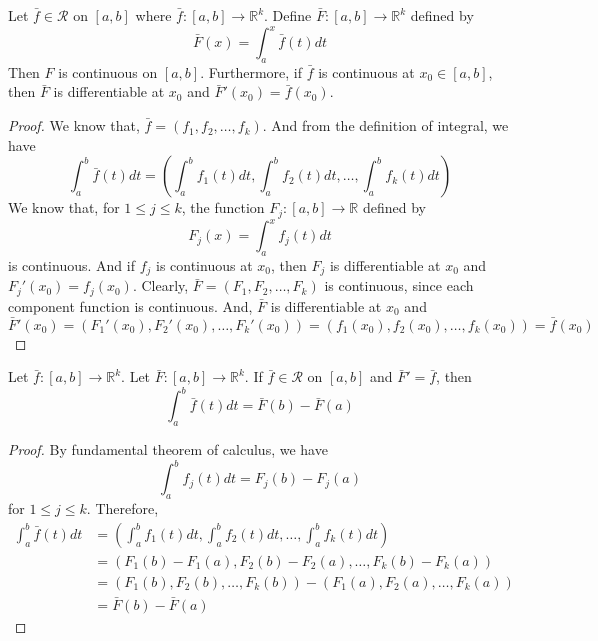 \begin{commentary}
\begin{theorem}
	Let $\bar{f} \in \mathscr{R}$ on $[a,b]$ where $\bar{f} : [a,b] \to \mathbb{R}^k$.
	Define $\bar{F} : [a,b] \to \mathbb{R}^k$ defined by
		\[ \bar{F}(x) = \int_a^x \bar{f}(t) dt \]
	Then $F$ is continuous on $[a,b]$.
	Furthermore, if $\bar{f}$ is continuous at $x_0 \in [a,b]$, then $\bar{F}$ is differentiable at $x_0$ and $\bar{F}'(x_0) = \bar{f}(x_0)$.
\end{theorem}
\begin{proof}
	We know that, $\bar{f} = (f_1,f_2,\dots,f_k)$.
	And from the definition of integral, we have
		\[ \int_a^b \bar{f}(t) dt = \left( \int_a^b f_1(t) dt, \int_a^b f_2(t) dt,\dots, \int_a^b f_k(t) dt \right) \]
	We know that, for $1 \le j \le k$, the function $F_j : [a,b] \to \mathbb{R}$ defined by 
		\[ F_j(x) = \int_a^x f_j(t) dt \]
	is continuous.
	And if $f_j$ is continuous at $x_0$, then $F_j$ is differentiable at $x_0$ and $F_j'(x_0) = f_j(x_0)$.
	Clearly, $\bar{F} = (F_1,F_2,\dots,F_k)$ is continuous, since each component function is continuous.
	And, $\bar{F}$ is differentiable at $x_0$ and
		\[ \bar{F}'(x_0) = \left( F_1'(x_0),F_2'(x_0),\dots,F_k'(x_0) \right) = (f_1(x_0),f_2(x_0),\dots,f_k(x_0)) = \bar{f}(x_0) \]
\end{proof}
\end{commentary}

\begin{theorem}
	Let $\bar{f} : [a,b] \to \mathbb{R}^k$.
	Let $\bar{F} : [a,b] \to \mathbb{R}^k$.
	If $\bar{f} \in \mathscr{R}$ on $[a,b]$ and $\bar{F}' = \bar{f}$, then
		\[ \int_a^b \bar{f}(t) dt = \bar{F}(b) - \bar{F}(a) \]
\end{theorem}
\begin{proof}
By fundamental theorem of calculus, we have
	\[ \int_a^b f_j(t) dt = F_j(b) - F_j(a) \]
 	for $1 \le j \le k$.
Therefore,
\begin{align*}
	\int_a^b \bar{f}(t) dt
		& = \left( \int_a^b f_1(t) dt, \int_a^b f_2(t) dt, \dots, \int_a^b f_k(t) dt \right) \\
		& = \left( F_1(b)-F_1(a), F_2(b) - F_2(a), \dots, F_k(b) - F_k(a) \right) \\
		& = \left( F_1(b),F_2(b),\dots,F_k(b)\right) - \left(F_1(a), F_2(a),\dots,F_k(a)\right) \\
		& = \bar{F}(b) - \bar{F}(a)
\end{align*}
\end{proof}

